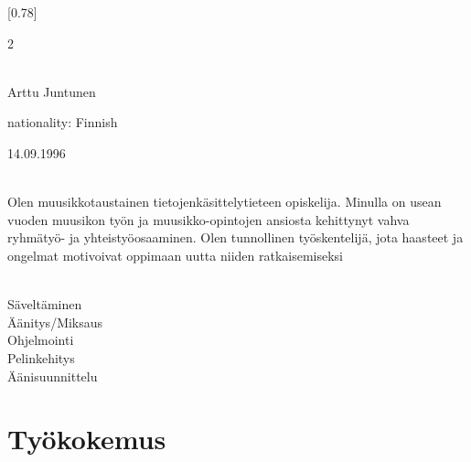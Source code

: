 \documentclass[lighthipster]{simplehipstercv}
\begin{document}
\setlength{\columnsep}{1cm}
[0.78]
\begin{paracol}{2}

\paracolbackgroundoptions



\footnotesize
{\setasidefontcolour
\flushright

\vspace*{5em}


 \\[0.5em]
Arttu Juntunen

nationality: Finnish

14.09.1996

\bigskip

\\[0.5em]

{\footnotesize
Olen muusikkotaustainen tietojenkäsittelytieteen opiskelija. Minulla on usean vuoden muusikon työn ja muusikko-opintojen ansiosta kehittynyt vahva ryhmätyö- ja yhteistyöosaaminen. Olen tunnollinen työskentelijä, jota haasteet ja ongelmat motivoivat oppimaan uutta niiden ratkaisemiseksi}
\bigskip

 \\[0.5em]

Säveltäminen \\
Äänitys/Miksaus \\
Ohjelmointi \\
Pelinkehitys \\
Äänisuunnittelu \\

\bigskip

\vspace{\fill}


\phantom{turn the page}

\phantom{turn the page}
}
\switchcolumn

\normalsize
\section*{Työkokemus}


\end{paracol}
\end{document}

